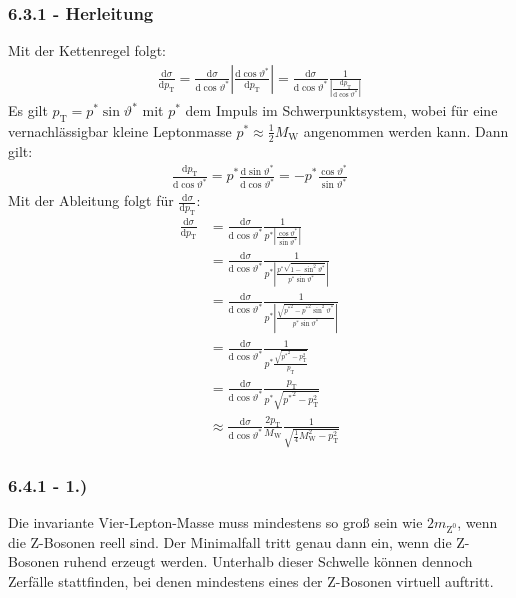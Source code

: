 \documentclass[11pt, a4paper]{article}
\numberwithin{equation}{section}
\begin{document}
\begin{appendix}
\subsubsection*{6.3.1 - Herleitung}
Mit der Kettenregel folgt:
\begin{align*}
	\frac{\mathrm{d}\sigma}{\mathrm{d}p_\mathrm{T}} = \frac{\mathrm{d}\sigma}{\mathrm{d}\cos\vartheta^*}\left|\frac{\mathrm{d}\cos\vartheta^*}{\mathrm{d}p_\mathrm{T}}\right| = \frac{\mathrm{d}\sigma}{\mathrm{d}\cos\vartheta^*}\frac{1}{\left|\frac{\mathrm{d}p_\mathrm{T}}{\mathrm{d}\cos\vartheta^*}\right|}
\end{align*}
Es gilt $p_\mathrm{T}=p^*\sin\vartheta^*$ mit $p^*$ dem Impuls im Schwerpunktsystem, wobei für eine vernachlässigbar kleine Leptonmasse $p^*\approx\frac{1}{2}M_\mathrm{W}$ angenommen werden kann.
Dann gilt:
\begin{align*}
	\frac{\mathrm{d}p_\mathrm{T}}{\mathrm{d}\cos\vartheta^*}=p^*\frac{\mathrm{d}\sin\vartheta^*}{\mathrm{d}\cos\vartheta^*}=-p^*\frac{\cos\vartheta^*}{\sin\vartheta^*}
\end{align*}
Mit der Ableitung folgt für $\frac{\mathrm{d}\sigma}{\mathrm{d}p_\mathrm{T}}$:
\begin{align*}
	\frac{\mathrm{d}\sigma}{\mathrm{d}p_\mathrm{T}}&=\frac{\mathrm{d}\sigma}{\mathrm{d}\cos\vartheta^*} \frac{1}{p^*\left|\frac{\cos\vartheta^*}{\sin\vartheta^*}\right|}\\
	&=\frac{\mathrm{d}\sigma}{\mathrm{d}\cos\vartheta^*} \frac{1}{p^*\left|\frac{p^*\sqrt{1-\sin^2\vartheta^*}}{p^*\sin\vartheta^*}\right|}\\
	&=\frac{\mathrm{d}\sigma}{\mathrm{d}\cos\vartheta^*} \frac{1}{p^*\left|\frac{\sqrt{{p^*}^2-{p^*}^2\sin^2\vartheta^*}}{p^*\sin\vartheta^*}\right|}\\
	&=\frac{\mathrm{d}\sigma}{\mathrm{d}\cos\vartheta^*} \frac{1}{p^*\frac{\sqrt{{p^*}^2-p_\mathrm{T}^2}}{p_\mathrm{T}}}\\
	&=\frac{\mathrm{d}\sigma}{\mathrm{d}\cos\vartheta^*} \frac{p_\mathrm{T}}{p^*\sqrt{{p^*}^2-p_\mathrm{T}^2}}\\
	&\approx \frac{\mathrm{d}\sigma}{\mathrm{d}\cos\vartheta^*} \frac{2p_\mathrm{T}}{M_\mathrm{W}} \frac{1}{\sqrt{\frac{1}{4}M_\mathrm{W}^2-p_\mathrm{T}^2}}
\end{align*}
\subsubsection*{6.4.1 - 1.)}
Die invariante Vier-Lepton-Masse muss mindestens so groß sein wie $2m_\mathrm{Z^0}$, wenn die Z-Bosonen reell sind.
Der Minimalfall tritt genau dann ein, wenn die Z-Bosonen ruhend erzeugt werden.
Unterhalb dieser Schwelle können dennoch Zerfälle stattfinden, bei denen mindestens eines der Z-Bosonen virtuell auftritt.


\end{appendix}
\end{document}
